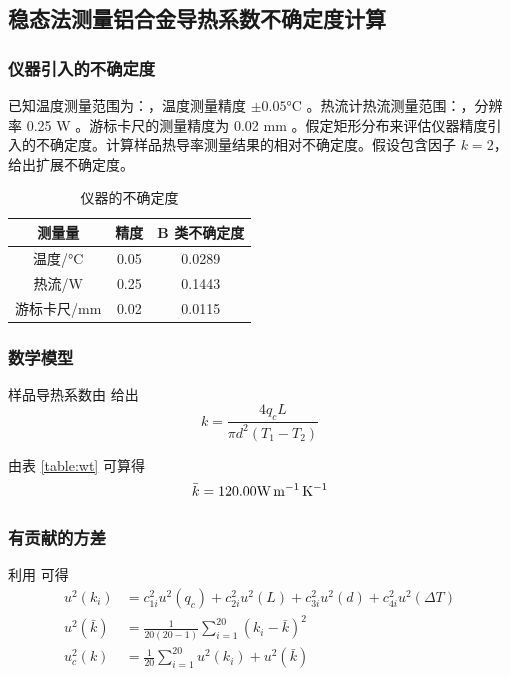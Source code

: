 \subsection{稳态法测量铝合金导热系数不确定度计算}
\subsubsection{仪器引入的不确定度}
已知温度测量范围为：，温度测量精度 $\pm 0.05 \unit{\degreeCelsius}$ 。热流计热流测量范围：\linebreak {}，分辨率 0.25 \unit{\watt} 。游标卡尺的测量精度为 0.02 \unit{\mm} 。假定矩形分布来评估仪器精度引入的不确定度。计算样品热导率测量结果的相对不确定度。假设包含因子 $k=2$，给出扩展不确定度。
\begin{table}[!ht]
    \caption{仪器的不确定度}
    \begin{tabularx}{0.7\textwidth}{*{3}{C}}\toprule
        测量量 & 精度 & B 类不确定度 \\ \midrule
        温度/\unit{\degreeCelsius} & 0.05 & 0.0289 \\
        热流/\unit{\W} & 0.25 & 0.1443 \\
        游标卡尺/\unit{\mm} & 0.02 & 0.0115 \\ \bottomrule
    \end{tabularx}
\end{table}
\subsubsection{数学模型}
    样品导热系数由 给出
    \begin{equation}
        k=\frac{4q_c L}{\pi d^2(T_1-T_2)} \label{equ:A10.4}
    \end{equation}\par
    由表 \ref{table:wt} 可算得
    \begin{equation}
        \bar{k}=120.00 \unit{\TTR}
    \end{equation}
\subsubsection{有贡献的方差}
利用 可得
\begin{align}
    u^2(k_i)&=c_{1i}^2u^2(q_c)+c_{2i}^2u^2(L)+c_{3i}^2u^2(d)+c_{4i}^2u^2(\Delta T) \\
    u^2(\bar{k})&=\frac{1}{20(20-1)}\sum_{i=1}^{20}(k_i-\bar{k})^2 \\ 
    u_c^2(k)&=\frac{1}{20}\sum_{i=1}^{20}u^2(k_i)+u^2(\bar{k}) \label{equ:A10.5}
\end{align}
